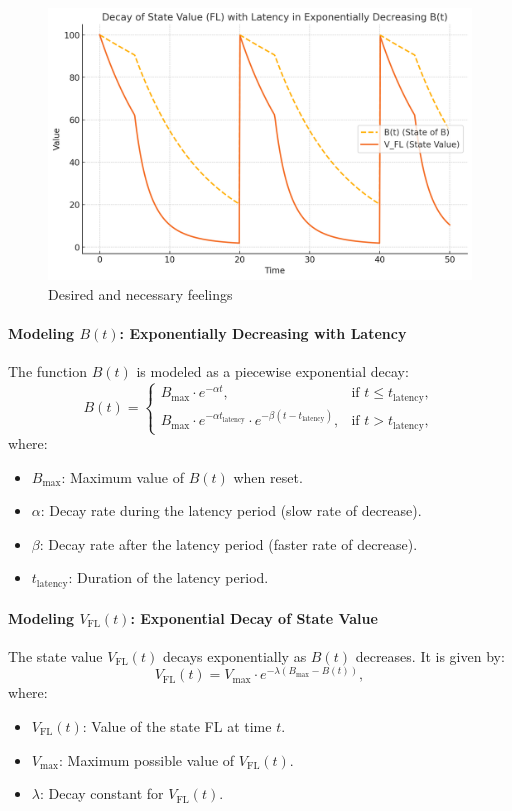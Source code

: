 \begin{figure}[H]
	\centering
	\includegraphics[scale = 0.5]{attachment/chapter_OWN/PRubric_Decay}
	\caption{Desired and necessary feelings}
\end{figure}



\paragraph{Modeling $ B(t) $: Exponentially Decreasing with Latency}
The function $ B(t) $ is modeled as a piecewise exponential decay:
\[
B(t) =
\begin{cases}
B_{\text{max}} \cdot e^{-\alpha t}, & \text{if } t \leq t_{\text{latency}}, \\
B_{\text{max}} \cdot e^{-\alpha t_{\text{latency}}} \cdot e^{-\beta (t - t_{\text{latency}})}, & \text{if } t > t_{\text{latency}},
\end{cases}
\]
where:
\begin{itemize}
    \item $ B_{\text{max}} $: Maximum value of $ B(t) $ when reset.
    \item $ \alpha $: Decay rate during the latency period (slow rate of decrease).
    \item $ \beta $: Decay rate after the latency period (faster rate of decrease).
    \item $ t_{\text{latency}} $: Duration of the latency period.
\end{itemize}

\paragraph{Modeling $ V_{\text{FL}}(t) $: Exponential Decay of State Value}
The state value $ V_{\text{FL}}(t) $ decays exponentially as $ B(t) $ decreases. It is given by:
\[
V_{\text{FL}}(t) = V_{\text{max}} \cdot e^{-\lambda (B_{\text{max}} - B(t))},
\]
where:
\begin{itemize}
    \item $ V_{\text{FL}}(t) $: Value of the state FL at time $ t $.
    \item $ V_{\text{max}} $: Maximum possible value of $ V_{\text{FL}}(t) $.
    \item $ \lambda $: Decay constant for $ V_{\text{FL}}(t) $.
\end{itemize}

